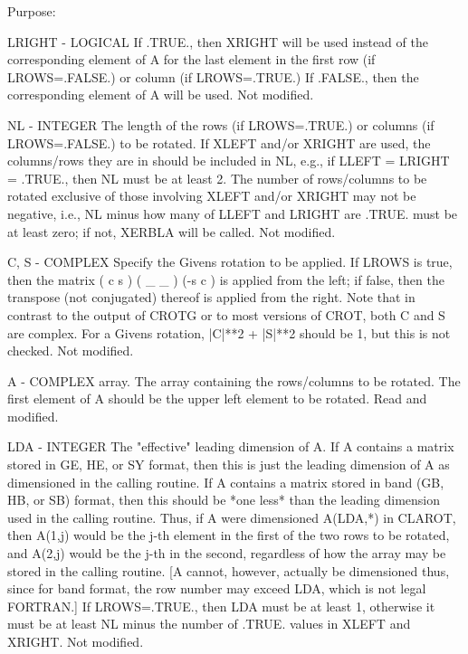 \begin{DoxyParagraph}{Purpose\+: }
\begin{DoxyVerb}
  LRIGHT - LOGICAL
           If .TRUE., then XRIGHT will be used instead of the
           corresponding element of A for the last element in the
           first row (if LROWS=.FALSE.) or column (if LROWS=.TRUE.) If
           .FALSE., then the corresponding element of A will be used.
           Not modified.

  NL     - INTEGER
           The length of the rows (if LROWS=.TRUE.) or columns (if
           LROWS=.FALSE.) to be rotated.  If XLEFT and/or XRIGHT are
           used, the columns/rows they are in should be included in
           NL, e.g., if LLEFT = LRIGHT = .TRUE., then NL must be at
           least 2.  The number of rows/columns to be rotated
           exclusive of those involving XLEFT and/or XRIGHT may
           not be negative, i.e., NL minus how many of LLEFT and
           LRIGHT are .TRUE. must be at least zero; if not, XERBLA
           will be called.
           Not modified.

  C, S   - COMPLEX
           Specify the Givens rotation to be applied.  If LROWS is
           true, then the matrix ( c  s )
                                 ( _  _ )
                                 (-s  c )  is applied from the left;
           if false, then the transpose (not conjugated) thereof is
           applied from the right.  Note that in contrast to the
           output of CROTG or to most versions of CROT, both C and S
           are complex.  For a Givens rotation, |C|**2 + |S|**2 should
           be 1, but this is not checked.
           Not modified.

  A      - COMPLEX array.
           The array containing the rows/columns to be rotated.  The
           first element of A should be the upper left element to
           be rotated.
           Read and modified.

  LDA    - INTEGER
           The "effective" leading dimension of A.  If A contains
           a matrix stored in GE, HE, or SY format, then this is just
           the leading dimension of A as dimensioned in the calling
           routine.  If A contains a matrix stored in band (GB, HB, or
           SB) format, then this should be *one less* than the leading
           dimension used in the calling routine.  Thus, if A were
           dimensioned A(LDA,*) in CLAROT, then A(1,j) would be the
           j-th element in the first of the two rows to be rotated,
           and A(2,j) would be the j-th in the second, regardless of
           how the array may be stored in the calling routine.  [A
           cannot, however, actually be dimensioned thus, since for
           band format, the row number may exceed LDA, which is not
           legal FORTRAN.]
           If LROWS=.TRUE., then LDA must be at least 1, otherwise
           it must be at least NL minus the number of .TRUE. values
           in XLEFT and XRIGHT.
           Not modified.


\end{DoxyVerb}
\end{DoxyParagraph}
